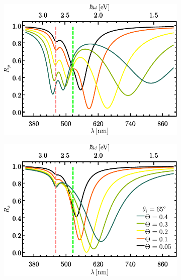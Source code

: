 \begin{figure}[h!]\centering
	\begin{subfigure}{.01\linewidth}\caption{}\label{sfig:R-ATR4-cutp}\vspace{3.75cm}\end{subfigure}\hspace*{-.5em}
	\begin{subfigure}{.45\linewidth}\centering \includegraphics[scale=.75 ]{2-Resultados/figs/1-Wp4ThetaVar/cut_angle_65_p.pdf}\end{subfigure}
	\begin{subfigure}{.01\linewidth}\caption{}\label{sfig:R-ATR4-cuts}\vspace{3.75cm}\end{subfigure}\hspace*{-.5em}
	\begin{subfigure}{.45\linewidth}\centering \includegraphics[scale=.75 ]{2-Resultados/figs/1-Wp4ThetaVar/cut_angle_65_s.pdf}\end{subfigure}\vspace*{-.5em}

\end{figure}
